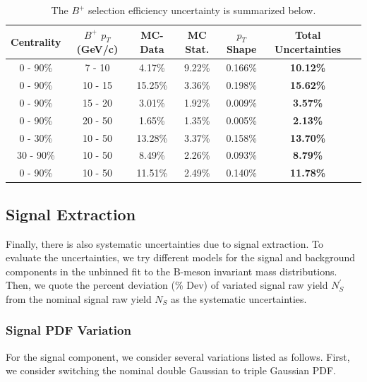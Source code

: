 \begin{table}[h]
\begin{center}
\caption{The $B^+$ selection efficiency uncertainty is summarized below.}
\vspace{1em}
\label{BPSelSum}
  \begin{tabular}{| c | c |c | c| c| c| c| }
    \hline
     Centrality & $B^+$ $p_T$ (GeV/c) & MC-Data  & MC Stat. & $p_T$ Shape & Total Uncertainties \\
    \hline
    \hline
0 - 90\% & 7 - 10 &   4.17\%  &  9.22\% & 0.166\% &  \textbf{10.12\%} \\ 
0 - 90\% & 10 - 15 & 15.25\%  & 3.36\%  & 0.198\% &   \textbf{15.62\%}  \\ 
0 - 90\% & 15 - 20 &  3.01\%   & 1.92\%   & 0.009\% &  \textbf{3.57\%} \\ 
0 - 90\% & 20 - 50 &  1.65\%   & 1.35\%  &  0.005\%  &   \textbf{2.13\%}\\ 
0 - 30\% & 10 - 50  & 13.28\%  & 3.37\%  &0.158\% &  \textbf{13.70\%} \\ 
30 - 90\% & 10 - 50 &  8.49\% &   2.26\%  & 0.093\% &  \textbf{8.79\%} \\ 
0 - 90\% & 10 - 50 & 11.51\%   & 2.49\%  & 0.140\% &   \textbf{11.78\%} \\ 
    \hline
    \hline
\end{tabular}
\end{center}
\end{table}



\subsection{Signal Extraction}

Finally, there is also systematic uncertainties due to signal extraction. To evaluate the uncertainties, we try different models for the signal and background components in the unbinned fit to the B-meson invariant mass distributions. Then, we quote the percent deviation (\% Dev) of variated signal raw yield $N_S^{'}$ from the nominal signal raw yield $N_S$ as the systematic uncertainties.  

\subsubsection{Signal PDF Variation}

For the signal component, we consider several variations listed as follows. First, we consider switching the nominal double Gaussian to triple Gaussian PDF.

